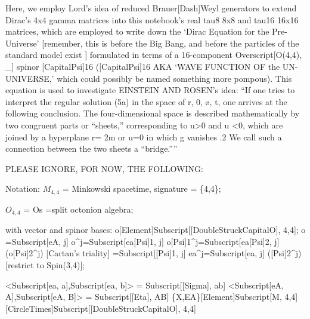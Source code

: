 \documentclass[10pt]{article}
\makeatletter
\newcommand\keepnext{\par\nopagebreak\@nobreaktrue\everypar{\@nobreakfalse\everypar{}}}
\makeatother
\begin{document}
Here,  we employ  Lord's  idea of reduced Brauer[Dash]Weyl generators to extend Dirac's 4x4 gamma matrices into  this notebook's  real tau8  8x8 and  tau16   16x16 matrices, which  are  employed  to write  down the `Dirac Equation  for the Pre-Universe' [remember, this is before  the  Big Bang,  and before  the particles  of  the  standard  model  exist ] formulated  in  terms  of a 16-component    Overscript[O(4,4), \_] spinor [CapitalPsi]16 ([CapitalPsi]16  AKA `WAVE FUNCTION OF  the UN-UNIVERSE,' which could possibly be named something more pompous). This equation is used to  investigate EINSTEIN AND ROSEN's idea: ``If one tries to interpret the regular solution (5a) in the space of r, 0, {\o}, t, one arrives at the following conclusion. The four-dimensional space is described mathematically by two congruent parts or ``sheets,'' corresponding to u\textgreater{}0 and u \textless{}0, which are joined by a hyperplane r= 2m or u=0 in which g vanishes .2 We call such a connection between the two sheets a ``bridge.''{}''


PLEASE IGNORE, FOR NOW, THE FOLLOWING:\keepnext


Notation: $M_{4,4}$ = Minkowski spacetime,  signature = \{4,4\};


$O_{4,4}$ = Os =split octonion algebra;


with  vector  and spinor bases: o[Element]Subscript[[DoubleStruckCapitalO], 4,4]; o =Subscript[eA, j] o\^{}j=Subscript[ea[Psi]1, j] o[Psi]1\^{}j=Subscript[ea[Psi]2, j] (o[Psi]2\^{}j)   [Cartan's   triality] =Subscript[[Psi]1, j] ea\^{}j=Subscript[ea, j] ([Psi]2\^{}j)  [restrict  to   Spin(3,4)];


\textless{}Subscript[ea, a],Subscript[ea, b]\textgreater{} = Subscript[[Sigma], ab] \textless{}Subscript[eA, A],Subscript[eA, B]\textgreater{} = Subscript[[Eta], AB] \{X,EA\}[Element]Subscript[M, 4,4][CircleTimes]Subscript[[DoubleStruckCapitalO], 4,4]
\end{document}
